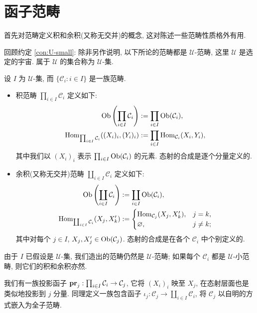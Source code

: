 \section{函子范畴}\label{sec:functor-category}
首先对范畴定义积和余积(又称无交并)的概念, 这对陈述一些范畴性质格外有用.

回顾约定 \ref{con:U-small}: 除非另作说明, 以下所论的范畴都是 $\mathcal{U}$-范畴, 这里 $\mathcal{U}$ 是选定的宇宙. 属于 $\mathcal{U}$ 的集合称为 $\mathcal{U}$-集.

\begin{definition}
	设 $I$ 为 $\mathcal{U}$-集, 而 $\{\mathcal{C}_i : i \in I \}$ 是一族范畴.
	\begin{itemize}
		\item 积范畴 $\prod_{i \in I} \mathcal{C}_i$ 定义如下:
			\begin{align*}
				\operatorname{Ob}\left( \prod_{i \in I} \mathcal{C}_i \right) & := \prod_{i \in I} \operatorname{Ob}(\mathcal{C}_i), \\
				\operatorname{Hom}_{\prod_{i \in I} \mathcal{C}_i}( (X_i)_i, (Y_i)_i ) & := \prod_{i \in I} \operatorname{Hom}_{\mathcal{C}_i}(X_i, Y_i),
			\end{align*}
			其中我们以 $(X_i)_i$ 表示 $\prod_{i \in I} \operatorname{Ob}(\mathcal{C}_i)$ 的元素. 态射的合成是逐个分量定义的.
		\item 余积(又称无交并)范畴 $\coprod_{i \in I} \mathcal{C}_i$ 定义如下:
			\begin{align*}
				\operatorname{Ob}\left( \coprod_{i \in I} \mathcal{C}_i \right) & := \coprod_{i \in I} \operatorname{Ob}(\mathcal{C}_i), \\
				\operatorname{Hom}_{\coprod_{i \in I} \mathcal{C}_i}(X_j, X'_k) & :=
				\begin{cases}
					\operatorname{Hom}_{\mathcal{C}_j}(X_j, X'_k), & j = k, \\
					\varnothing, & j \neq k;
				\end{cases}
			\end{align*}
			其中对每个 $j \in I$, $X_j, X'_j \in \operatorname{Ob}(\mathcal{C}_j)$. 态射的合成是在各个 $\mathcal{C}_i$ 中个别定义的.
	\end{itemize}
\end{definition}
由于 $I$ 已假设是 $\mathcal{U}$-集, 我们造出的范畴仍然是 $\mathcal{U}$-范畴; 如果每个 $\mathcal{C}_i$ 都是 $\mathcal{U}$-小范畴, 则它们的积和余积亦然.

我们有一族投影函子 $\mathbf{pr}_j: \prod_{i \in I} \mathcal{C}_i \to \mathcal{C}_j$, 它将 $(X_i)_i$ 映至 $X_j$, 在态射层面也是类似地投影到 $j$ 分量. 同理定义一族包含函子 $\iota_j: \mathcal{C}_j \to \coprod_{i \in I} \mathcal{C}_i$, 将 $\mathcal{C}_j$ 以自明的方式嵌入为全子范畴.

